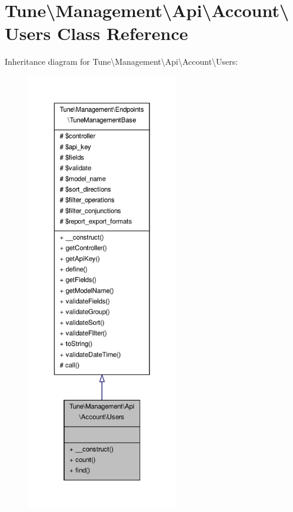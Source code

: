 \hypertarget{classTune_1_1Management_1_1Api_1_1Account_1_1Users}{\section{Tune\textbackslash{}Management\textbackslash{}Api\textbackslash{}Account\textbackslash{}Users Class Reference}
\label{classTune_1_1Management_1_1Api_1_1Account_1_1Users}
}


Inheritance diagram for Tune\textbackslash{}Management\textbackslash{}Api\textbackslash{}Account\textbackslash{}Users\-:
\nopagebreak
\begin{figure}[H]
\begin{center}
\leavevmode
\includegraphics[height=550pt]{classTune_1_1Management_1_1Api_1_1Account_1_1Users__inherit__graph}
\end{center}
\end{figure}


